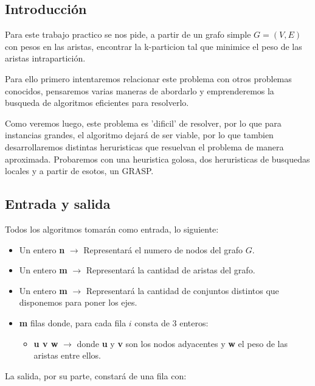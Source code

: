 \subsection{Introducción}

Para este trabajo practico se nos pide, a partir de un grafo simple $G=(V,E)$ con pesos en las aristas, encontrar la k-particion tal que minimice el peso de las aristas intrapartición.

Para ello primero intentaremos relacionar este problema con otros problemas conocidos, pensaremos varias maneras de abordarlo y emprenderemos la busqueda de algoritmos eficientes para resolverlo.

Como veremos luego, este problema es 'dificil' de resolver, por lo que para instancias grandes, el algoritmo dejará de ser viable, por lo que tambien desarrollaremos distintas heruristicas que resuelvan el problema de manera aproximada. Probaremos con una heuristica golosa, dos heruristicas de busquedas locales y a partir de esotos, un GRASP.

\subsection{Entrada y salida}

Todos los algoritmos tomarán como entrada, lo siguiente:

\begin{itemize}
	\item Un entero \textbf{n} $\rightarrow$ Representará el numero de nodos del grafo $G$.

	\item Un entero \textbf{m} $\rightarrow$ Representará la cantidad de aristas del grafo.

	\item Un entero \textbf{m} $\rightarrow$ Representará la cantidad de conjuntos distintos que disponemos para poner los ejes.

	\item \textbf{m} filas donde, para cada fila $i$ consta de $3$ enteros:
	\begin{itemize}
		\item \textbf{u v w} $ \rightarrow $ donde \textbf{u} y \textbf{v} son los nodos adyacentes y \textbf{w} el peso de las aristas entre ellos.
	\end{itemize}
\end{itemize}

La salida, por su parte, constar\'a de una fila con:

